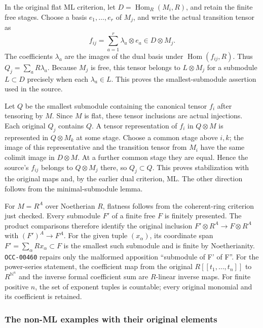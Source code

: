 In the original flat ML criterion, let \(D=\operatorname{Hom}_R(M_i,R)\), and retain the finite free stages. Choose a basis \(e_1,\ldots,e_r\) of \(M_j\), and write the actual transition tensor as \[
f_{ij}=\sum_{a=1}^r \lambda_a\otimes e_a\in D\otimes M_j.
\] The coefficients \(\lambda_a\) are the images of the dual basis under \(\operatorname{Hom}(f_{ij},R)\). Thus \(Q_j=\sum_aR\lambda_a\). Because \(M_j\) is free, this tensor belongs to \(L\otimes M_j\) for a submodule \(L\subset D\) precisely when each \(\lambda_a\in L\). This proves the smallest-submodule assertion used in the source.

Let \(Q\) be the smallest submodule containing the canonical tensor \(f_i\) after tensoring by \(M\). Since \(M\) is flat, these tensor inclusions are actual injections. Each original \(Q_j\) contains \(Q\). A tensor representation of \(f_i\) in \(Q\otimes M\) is represented in \(Q\otimes M_k\) at some stage. Choose a common stage above \(i,k\); the image of this representative and the transition tensor from \(M_i\) have the same colimit image in \(D\otimes M\). At a further common stage they are equal. Hence the source's \(f_{ij}\) belongs to \(Q\otimes M_j\) there, so \(Q_j\subset Q\). This proves stabilization with the original maps and, by the earlier dual criterion, ML. The other direction follows from the minimal-submodule lemma.

For \(M=R^A\) over Noetherian \(R\), flatness follows from the coherent-ring criterion just checked. Every submodule \(F'\) of a finite free \(F\) is finitely presented. The product comparisons therefore identify the original inclusion \(F'\otimes R^A\to F\otimes R^A\) with \((F')^A\to F^A\). For the given tuple \((x_\alpha)\), its coordinate span \(F'=\sum_\alpha Rx_\alpha\subset F\) is the smallest such submodule and is finite by Noetherianity. \texttt{OCC-00460} repairs only the malformed apposition ``submodule of F' of F''. For the power-series statement, the coefficient map from the original \(R[[t_1,\ldots,t_n]]\) to \(R^{\mathbb N^n}\) and the inverse formal coefficient sum are \(R\)-linear inverse maps. For finite positive \(n\), the set of exponent tuples is countable; every original monomial and its coefficient is retained.

\subsubsection{The non-ML examples with their original elements}\label{algebra-proof-013-the-non-ml-examples-with-their-original-elements}

